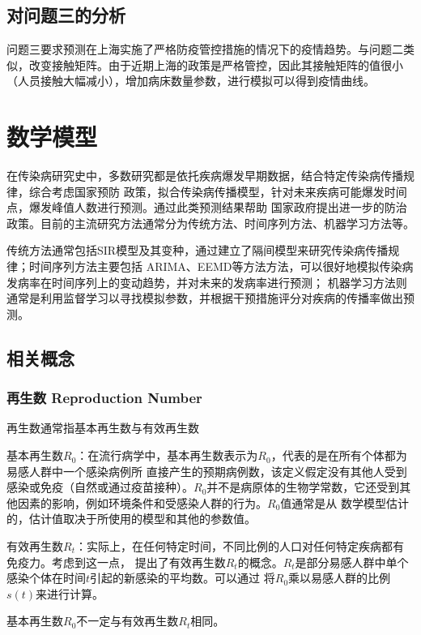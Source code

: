 \documentclass[bwprint]{gmcmthesis}
\numberwithin{figure}{section}
\begin{document}
\subsection{对问题三的分析}
问题三要求预测在上海实施了严格防疫管控措施的情况下的疫情趋势。与问题二类似，改变接触矩阵。由于近期上海的政策是严格管控，因此其接触矩阵的值很小（人员接触大幅减小），增加病床数量参数，进行模拟可以得到疫情曲线。

\section{数学模型}
\par 在传染病研究史中，多数研究都是依托疾病爆发早期数据，结合特定传染病传播规律，综合考虑国家预防
政策，拟合传染病传播模型，针对未来疾病可能爆发时间点，爆发峰值人数进行预测。通过此类预测结果帮助
国家政府提出进一步的防治政策。目前的主流研究方法通常分为传统方法、时间序列方法、机器学习方法等。
\par 传统方法通常包括SIR模型及其变种，通过建立了隔间模型来研究传染病传播规律；时间序列方法主要包括
ARIMA、EEMD等方法方法，可以很好地模拟传染病发病率在时间序列上的变动趋势，并对未来的发病率进行预测；
机器学习方法则通常是利用监督学习以寻找模拟参数，并根据干预措施评分对疾病的传播率做出预测。

\subsection{相关概念}
\subsubsection{再生数 Reproduction Number}
再生数通常指基本再生数与有效再生数

\par 基本再生数$R_0$：在流行病学中，基本再生数表示为$R_0$，代表的是在所有个体都为易感人群中一个感染病例所
直接产生的预期病例数，该定义假定没有其他人受到感染或免疫（自然或通过疫苗接种）。$R_0$并不是病原体的生物学常数，它还受到其他因素的影响，例如环境条件和受感染人群的行为。$R_0$值通常是从
数学模型估计的，估计值取决于所使用的模型和其他的参数值。
\par 有效再生数$R_t$：实际上，在任何特定时间，不同比例的人口对任何特定疾病都有免疫力。考虑到这一点，
提出了有效再生数$R_t$的概念。$R_t$是部分易感人群中单个感染个体在时间$t$引起的新感染的平均数。可以通过
将$R_0$乘以易感人群的比例$s\left( t \right)$来进行计算。
\par 基本再生数$R_0$不一定与有效再生数$R_t$相同。
\end{document}
